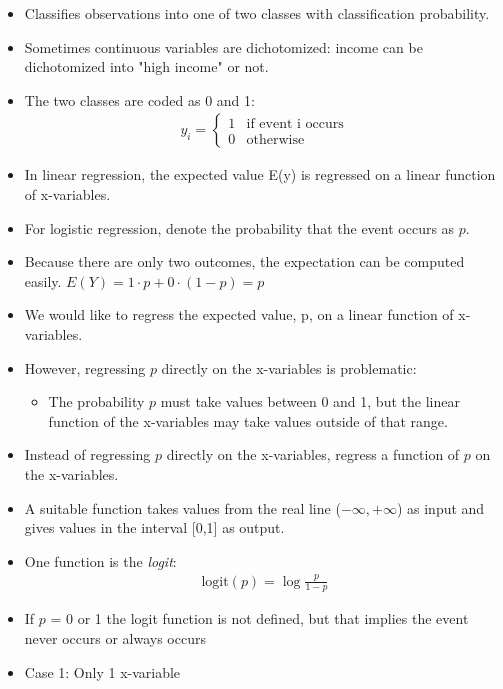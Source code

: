 \documentclass[12pt, oneside]{article}
\begin{document}
\begin{itemize}
    \item Classifies observations into one of two classes with classification probability.
    \item Sometimes continuous variables are dichotomized: income can be dichotomized into "high income" or not.
    \item The two classes are coded as 0 and 1:
    \begin{align*}
        y_i = \begin{cases}
        1 & \text{if event i occurs} \\
        0 & \text{otherwise}
        \end{cases}
    \end{align*}
    \item In linear regression, the expected value E(y) is regressed on a linear function of x-variables.
    \item For logistic regression, denote the probability that the event occurs as $p$.
    \item Because there are only two outcomes, the expectation can be computed easily.
    $E(Y) = 1 \cdot p + 0 \cdot (1-p) = p$
    \item We would like to regress the expected value, p, on a linear function of x-variables.
    \item However, regressing $p$ directly on the x-variables is problematic: 
    \begin{itemize}
        \item The probability $p$ must take values between 0 and 1, but the linear function of the x-variables may take values outside of that range. 
    \end{itemize}
    \item Instead of regressing $p$ directly on the x-variables, regress a function of $p$ on the x-variables.
    \item A suitable function takes values from the real line ($-\infty, +\infty$) as input and gives values in the interval [0,1] as output.
    \item One function is the \emph{logit}:
    \begin{align*}
        \text{logit}(p) = \log \frac{p}{1-p}
    \end{align*}
    \item If $p$ = 0 or 1 the logit function is not defined, but that implies the event never occurs or always occurs
    \item Case 1: Only 1 x-variable

\end{itemize}
\end{document}

